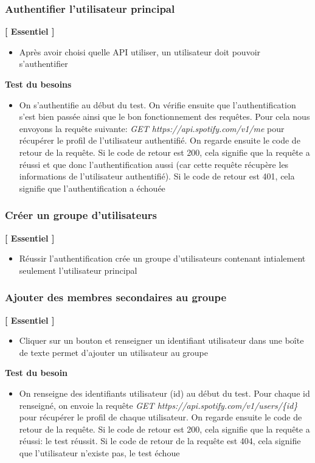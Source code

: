 \documentclass{article}
\begin{document}
		\subsubsection{Authentifier l'utilisateur principal} \label{authentification}
		\textbf{[ Essentiel ]}
		\begin{itemize}
			\item Après avoir choisi quelle API utiliser, un utilisateur doit pouvoir s'authentifier
		\end{itemize}
		\textbf{Test du besoins} 
		\begin{itemize}
			\item On s'authentifie au début du test. On vérifie ensuite que l'authentification s'est bien passée ainsi que le bon fonctionnement des requêtes. Pour cela nous envoyons la requête suivante: \textit{GET https://api.spotify.com/v1/me} pour récupérer le profil de l'utilisateur authentifié. On regarde ensuite le code de retour de la requête. Si le code de retour est 200, cela signifie que la requête a réussi et que donc l'authentification aussi (car cette requête récupère les informations de l'utilisateur authentifié). Si le code de retour est 401, cela signifie que l'authentification a échouée
		\end{itemize}
		\newpage
		\subsubsection{Créer un groupe d'utilisateurs}
		\textbf{[ Essentiel ]}
		\begin{itemize}
			\item Réussir l'authentification crée un groupe d'utilisateurs contenant intialement seulement l'utilisateur principal
		\end{itemize}
		\subsubsection{Ajouter des membres secondaires au groupe}  \label{connexion}
		\textbf{[ Essentiel ]}
		\begin{itemize}
			\item Cliquer sur un bouton et renseigner un identifiant utilisateur dans une boîte de texte permet d'ajouter un utilisateur au groupe
		\end{itemize}
		\textbf{Test du besoin} 
		\begin{itemize}
			\item On renseigne des identifiants utilisateur (id) au début du test. Pour chaque id renseigné, on envoie la requête \textit{GET https://api.spotify.com/v1/users/\{id\}} pour récupérer le profil de chaque utilisateur. On regarde ensuite le code de retour de la requête. Si le code de retour est 200, cela signifie que la requête a réussi: le test réussit. Si le code de retour de la requête est 404, cela signifie que l'utilisateur n'existe pas, le test échoue
		\end{itemize}
\end{document}
